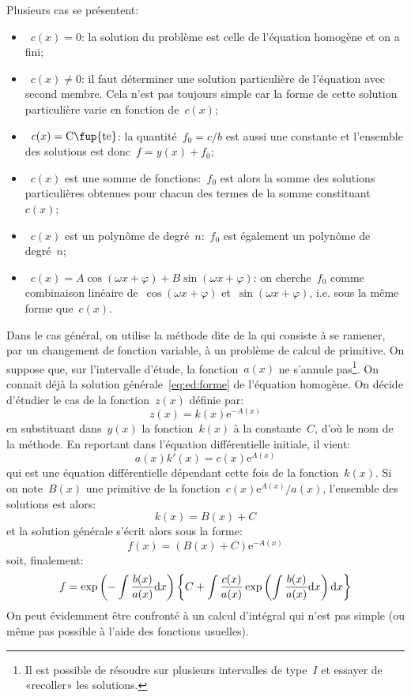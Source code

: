 Plusieurs cas se présentent:
\begin{itemize}
\item~$c(x)=0$: la solution du problème est celle de l'équation homogène et on a fini;
\item~$c(x)\ne0$: il faut déterminer une solution particulière de l'équation avec second membre. Cela n'est pas toujours simple car la forme de cette solution particulière varie en fonction de~$c(x)$;
\item~$c(x)=\text{C\fup{te}}$: la quantité~$f_0=c/b$ est aussi une constante et l'ensemble des solutions est donc~$f=y(x)+f_0$;
\item~$c(x)$ est une somme de fonctions:~$f_0$ est alors la somme des solutions particulières obtenues pour chacun des termes de la somme constituant~$c(x)$;
\item~$c(x)$ est un polynôme de degré~$n$:~$f_0$ est également un polynôme de degré~$n$;
\item~$c(x) = A\cos(\omega x + \varphi) + B \sin(\omega x + \varphi)$: on cherche~$f_0$ comme combinaison linéaire de~$\cos(\omega x + \varphi)$ et~$\sin(\omega x + \varphi)$, i.e. sous la même forme que~$c(x)$. 
\end{itemize}
Dans le cas général, on utilise la méthode dite de la  qui consiste à se ramener, par un changement de fonction variable, à un problème de calcul de primitive. On suppose que, sur l'intervalle d'étude, la fonction~$a(x)$ ne s'annule pas\footnote{Il est possible de résoudre sur plusieurs intervalles de type~$I$ et essayer de «recoller» les solutions.}. On connait déjà la solution générale~\eqref{eq:ed:forme} de l'équation homogène. On décide d'étudier le cas de la fonction~$z(x)$ définie par:
\begin{equation}
z(x) = k(x)\mathrm{e}^{- A(x)}
\end{equation}
en substituant dans~$y(x)$ la fonction~$k(x)$ à la constante~$C$, d'où le nom de la méthode. En reportant dans l'équation différentielle initiale, il vient:
\begin{equation}
a(x)k'(x) = c(x)\mathrm{e}^{A(x)}
\end{equation}
qui est une équation différentielle dépendant cette fois de la fonction~$k(x)$. Si on note~$B(x)$ une primitive de la fonction~$c(x) \mathrm{e}^{A(x)}/a(x)$, l'ensemble des solutions est alors:
\begin{equation}
k(x) = B(x) + C
\end{equation}
et la solution générale s'écrit alors sous la forme:
\begin{equation}
f(x) = (B(x) + C) \mathrm{e}^{-A(x)}
\end{equation}
soit, finalement:
\begin{equation}
f = \exp\left( -\int\frac{b(x)}{a(x)}\text{d} x \right) \left\{ C + \int \frac{c(x)}{a(x)} \exp\left(\int \frac{b(x)}{a(x)}\text{d} x \right)\text{d} x \right\}
\end{equation}
On peut évidemment être confronté à un calcul d'intégral qui n'est pas simple (ou même pas possible à l'aide des fonctions usuelles). 
 

